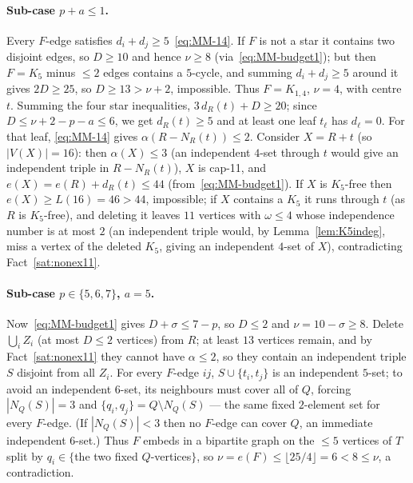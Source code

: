 \documentclass[11pt,reqno]{amsart}
\theoremstyle{definition}
\theoremstyle{remark}
\newcommand{\abs}[1]{\left|#1\right|}
\newcommand{\capeleven}{\textsf{cap-11}}
\begin{document}
\paragraph{Sub-case $p+a\le 1$.}
Every $F$-edge satisfies $d_i+d_j\ge 5$~\eqref{eq:MM-14}. If $F$ is not a star it
contains two disjoint edges, so $D\ge 10$ and hence $\nu\ge 8$
(via~\eqref{eq:MM-budget1}); but then $F=K_5$ minus $\le 2$ edges contains a
$5$-cycle, and summing $d_i+d_j\ge 5$ around it gives $2D\ge 25$, so $D\ge 13>\nu+2$,
impossible. Thus $F=K_{1,4}$, $\nu=4$, with centre $t$. Summing the four star
inequalities, $3\,d_R(t)+D\ge 20$; since $D\le\nu+2-p-a\le 6$, we get $d_R(t)\ge 5$
and at least one leaf $t_\ell$ has $d_\ell=0$. For that leaf, \eqref{eq:MM-14} gives
$\alpha(R-N_R(t))\le 2$. Consider $X=R+t$ (so $\abs{V(X)}=16$): then $\alpha(X)\le 3$
(an independent $4$-set through $t$ would give an independent triple in
$R-N_R(t)$), $X$ is \capeleven, and $e(X)=e(R)+d_R(t)\le 44$
(from~\eqref{eq:MM-budget1}). If $X$ is $K_5$-free then $e(X)\ge L(16)=46>44$,
impossible; if $X$ contains a $K_5$ it runs through $t$ (as $R$ is $K_5$-free), and
deleting it leaves $11$ vertices with $\omega\le 4$ whose independence number is at
most $2$ (an independent triple would, by Lemma~\ref{lem:K5indeg}, miss a vertex of
the deleted $K_5$, giving an independent $4$-set of $X$), contradicting
Fact~\ref{sat:nonex11}.

\paragraph{Sub-case $p\in\{5,6,7\}$, $a=5$.}
Now~\eqref{eq:MM-budget1} gives $D+\sigma\le 7-p$, so $D\le 2$ and
$\nu=10-\sigma\ge 8$. Delete $\bigcup_i Z_i$ (at most $D\le 2$ vertices) from $R$;
at least $13$ vertices remain, and by Fact~\ref{sat:nonex11} they cannot have
$\alpha\le 2$, so they contain an independent triple $S$ disjoint from all $Z_i$.
For every $F$-edge $ij$, $S\cup\{t_i,t_j\}$ is an independent $5$-set; to avoid an
independent $6$-set, its neighbours must cover all of $Q$, forcing
$\abs{N_Q(S)}=3$ and $\{q_i,q_j\}=Q\setminus N_Q(S)$ --- the same fixed $2$-element
set for every $F$-edge. (If $\abs{N_Q(S)}<3$ then no $F$-edge can cover $Q$, an
immediate independent $6$-set.) Thus $F$ embeds in a bipartite graph on the
$\le 5$ vertices of $T$ split by $q_i\in\{$the two fixed $Q$-vertices$\}$, so
$\nu=e(F)\le\lfloor 25/4\rfloor=6<8\le\nu$, a contradiction.
\end{document}
